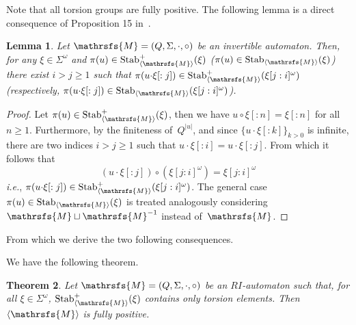 \documentclass{amsart}
\newtheorem{theorem}{Theorem}[section]
\newtheorem{lemma}[theorem]{Lemma}
\begin{document}
Note that all torsion groups are fully positive. The following lemma is a direct consequence of Proposition 15 in~\cite{DaRo14}.

\begin{lemma}\label{lemma: density prop of periodic points}
Let ${{{\mathrsfs{{M}}}}}=({{{Q}}},{{{\Sigma}}},{{{\cdot}}},{{{\circ}}})$ be an invertible automaton. Then, for any $\xi\in {{{\Sigma}}}^{\omega}$
and $\pi(u)\in\operatorname{Stab}^{+}_{{{\langle}{{\mathrsfs{{{M}}}}}{\rangle}}}(\xi)$ ($\pi(u)\in\operatorname{Stab}_{{{\langle}{{\mathrsfs{{{M}}}}}{\rangle}}}(\xi)$) there exist $i>j\ge 1$ such that $\pi(u{{{\cdot}}}
\xi[:j])\in \operatorname{Stab}^{+}_{{{\langle}{{\mathrsfs{{{M}}}}}{\rangle}}}(\xi[j:i]^{\omega})$ (respectively, $\pi(u{{{\cdot}}} \xi[:j])\in \operatorname{Stab}_{{{\langle}{{\mathrsfs{{{M}}}}}{\rangle}}}(\xi[j:i]^{\omega})$).
\end{lemma}

\begin{proof}
Let $\pi(u)\in\operatorname{Stab}^{+}_{{{\langle}{{\mathrsfs{{{M}}}}}{\rangle}}}(\xi)$, then we have $u{{{\circ}}} \xi[:n] = \xi[:n]$ for all $n\ge 1$. Furthermore, by the finiteness of~${{{Q}}}^{|u|}$, and since $\{u{{{\cdot}}} \xi[:k]\}_{k>0}$ is infinite, there are two indices $i>j\ge 1$ such that $u{{{\cdot}}} \xi[:i]=u{{{\cdot}}} \xi[:j]$. From which it follows that
$$
(u{{{\cdot}}} \xi[:j]) {{{\circ}}} (\xi[j:i]^{\omega})=\xi[j:i]^{\omega}
$$
\emph{i.e.}, $\pi(u{{{\cdot}}} \xi[:j])\in \operatorname{Stab}^{+}_{{{\langle}{{\mathrsfs{{{M}}}}}{\rangle}}}(\xi[j:i]^{\omega})$. The general case $\pi(u)\in\operatorname{Stab}_{{{\langle}{{\mathrsfs{{{M}}}}}{\rangle}}}(\xi)$ is treated analogously considering~${{{\mathrsfs{{M}}}}}\sqcup {{{\mathrsfs{{M}}}}}^{-1}$ instead of~${{{\mathrsfs{{M}}}}}$.
\end{proof}

From which we derive the two following consequences.

We have the following theorem.

\begin{theorem}\label{theo: alternatives}
Let ${{{\mathrsfs{{M}}}}}=({{{Q}}},{{{\Sigma}}},{{{\cdot}}},{{{\circ}}})$ be an $RI$-automaton such that, for all $\xi\in {{{\Sigma}}}^{\omega}$, $\operatorname{Stab}^{+}_{{{\langle}{{\mathrsfs{{{M}}}}}{\rangle}}}(\xi)$ contains only torsion elements. Then ${{{\langle}{{\mathrsfs{{{M}}}}}{\rangle}}}$ is fully positive.
\end{theorem}
\end{document}
